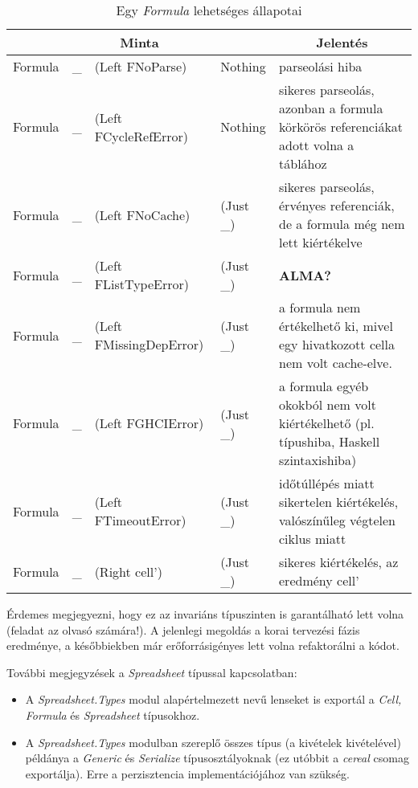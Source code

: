 \begin{table}
	\centering
	\begin{tabularx}{\textwidth}{ |l l l l| X |}
		\hline
		\multicolumn{4}{|c|}{Minta} & \multicolumn{1}{|c|}{Jelentés} \\
		\hline\hline
		Formula & \_ & (Left FNoParse) & Nothing & parseolási hiba \\
		\hline
		Formula & \_ & (Left FCycleRefError) & Nothing & sikeres parseolás, azonban a formula körkörös referenciákat adott volna a táblához \\
		\hline
		Formula & \_ & (Left FNoCache) & (Just \_) & sikeres parseolás, érvényes referenciák, de a formula még nem lett kiértékelve \\
		\hline
		Formula & \_ & (Left FListTypeError) & (Just \_) & \textbf{ALMA?} \\
		\hline
		Formula & \_ & (Left FMissingDepError) & (Just \_) & a formula nem értékelhető ki, mivel egy hivatkozott cella nem volt cache-elve. \\
		\hline
		Formula & \_ & (Left FGHCIError) & (Just \_) & a formula egyéb okokból nem volt kiértékelhető (pl. típushiba, Haskell szintaxishiba) \\
		\hline
		Formula & \_ & (Left FTimeoutError) & (Just \_) & időtúllépés miatt sikertelen kiértékelés, valószínűleg végtelen ciklus miatt \\
		\hline
		Formula & \_ & (Right cell') & (Just \_) & sikeres kiértékelés, az eredmény cell' \\
		\hline 
	\end{tabularx}
	\caption[Egy \textit{Formula} lehetséges állapotai]{Egy \textit{Formula} lehetséges állapotai}
	\label{tab:formula}
\end{table}

Érdemes megjegyezni, hogy ez az invariáns típuszinten is garantálható lett volna (feladat az olvasó számára!). A jelenlegi megoldás a korai tervezési fázis eredménye, a későbbiekben már erőforrásigényes lett volna refaktorálni a kódot.   

További megjegyzések a \textit{Spreadsheet} típussal kapcsolatban:
\begin{itemize}
	\item A \textit{Spreadsheet.Types} modul alapértelmezett nevű lenseket is exportál a \textit{Cell, Formula} és \textit{Spreadsheet} típusokhoz.
	\item A \textit{Spreadsheet.Types} modulban szereplő összes típus (a kivételek kivételével) példánya a \textit{Generic} és \textit{Serialize} típusosztályoknak (ez utóbbit a \textit{cereal} csomag exportálja). Erre a perzisztencia implementációjához van szükség.
\end{itemize}

